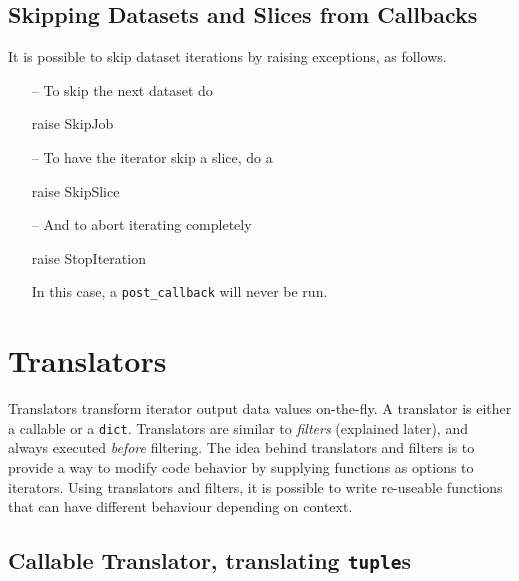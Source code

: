 \subsection*{Skipping Datasets and Slices from Callbacks}
It is possible to skip dataset iterations by raising exceptions, as
follows.
\begin{itemize}
\item [--] To skip the next dataset do
\begin{python}
raise SkipJob
\end{python}

\item [--]  To have the iterator skip a slice, do a
\begin{python}
raise SkipSlice
\end{python}

\item [--] And to abort iterating completely
\begin{python}
raise StopIteration
\end{python}
In this case, a \texttt{post\_callback} will never be run.
\end{itemize}







\section{Translators}
\label{sec:translators}

Translators transform iterator output data values on-the-fly.  A
translator is either a callable or a \texttt{dict}.  Translators are
similar to \textsl{filters} (explained later), and always
executed \emph{before} filtering.  The idea behind translators and
filters is to provide a way to modify code behavior by supplying
functions as options to iterators.  Using translators and filters,
it is possible to write re-useable functions that can have different
behaviour depending on context.


\subsection*{Callable Translator, translating \texttt{tuple}s}

